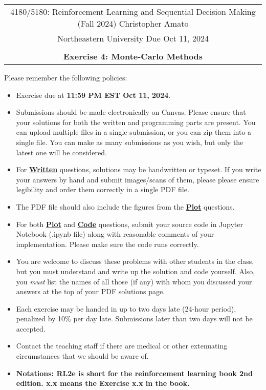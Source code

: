 \documentclass{article}
\begin{document}
\begin{center}
	\begin{tabular}{|c|}
		\hline
		4180/5180: Reinforcement Learning and Sequential Decision Making (Fall 2024) \hspace{1cm} Christopher Amato \\
		Northeastern University \hfill  Due Oct 11, 2024                                                    \\\\
		{\bfseries \large Exercise 4: Monte-Carlo Methods}                                    \\ \hline
	\end{tabular}
\end{center}


Please remember the following policies:
\begin{itemize}
	\item Exercise due at \textbf{11:59 PM EST Oct 11, 2024}.
	\item Submissions should be made electronically on Canvas. Please ensure that your solutions for both the written and programming parts are present. You can upload multiple files in a single submission, or you can zip them into a single file. You can make as many submissions as you wish, but only the latest one will be considered.

	\item For \uline{\textbf{Written}} questions, solutions may be handwritten or typeset. If you write your answers by hand and submit images/scans of them, please please ensure legibility and order them correctly in a single PDF file.
	\item The PDF file should also include the figures from the \uline{\textbf{Plot}} questions.
	\item For both \uline{\textbf{Plot}} and \uline{\textbf{Code}} questions, submit your source code in Jupyter Notebook (.ipynb file) along with reasonable comments of your implementation. Please make sure the code runs correctly. 
	\item You are welcome to discuss these problems with other students in the class, but you must understand and write up the solution and code yourself. Also, you \textit{must} list the names of all those (if any) with whom you discussed your answers at the top of your PDF solutions page.
	\item Each exercise may be handed in up to two days late (24-hour period), penalized by 10\% per day late. Submissions later than two days will not be accepted.
	\item Contact the teaching staff if there are medical or other extenuating circumstances that we should be aware of.
	\item \textbf{Notations: RL2e is short for the reinforcement learning book 2nd edition. x.x means the Exercise x.x in the book.}
\end{itemize}
\end{document}
